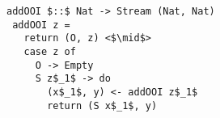 \begin{figure}[!t]
  \centering
  \begin{minipage}{0.9\columnwidth}
    \begin{lstlisting}[frame=tb]
 addOOI $::$ Nat -> Stream (Nat, Nat)
 addOOI z =
   return (O, z) <$\mid$>
   case z of
     O -> Empty
     S z$_1$ -> do
       (x$_1$, y) <- addOOI z$_1$
       return (S x$_1$, y)
    \end{lstlisting}
  \end{minipage}
\end{figure}
